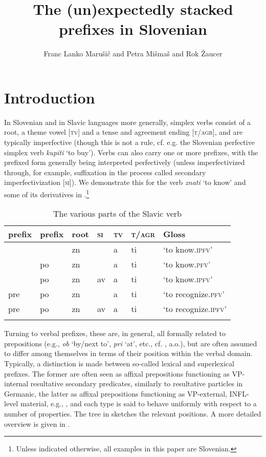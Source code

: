 \documentclass[output=paper,colorlinks,citecolor=brown]{langscibook}
\author{
Franc Lanko Marušič\orcid{0000-0002-0667-3236}\affiliation{University of Nova Gorica} and Petra Mišmaš\orcid{0000-0001-8659-875X}\affiliation{University of Nova Gorica} and Rok Žaucer\orcid{0000-0001-7771-6937}\affiliation{University of Nova Gorica}}
\title{The (un)expectedly stacked prefixes in Slovenian}
\begin{document}
\maketitle

\section{Introduction}\label{sec:introduction}

In Slovenian and in Slavic languages more generally, simplex verbs consist of a root, a theme vowel [\textsc{tv}] and a tense and agreement ending [\textsc{t/agr}], and are typically imperfective (though this is not a rule, cf. e.g. the Slovenian perfective simplex verb \textit{kupiti} `to buy'). Verbs can also carry one or more prefixes, with the prefixed form generally being interpreted perfectively (unless imperfectivized through, for example, suffixation in the process called secondary imperfectivization [\textsc{si}]). We demonstrate this for the verb \textit{znati} `to know' and some of its derivatives in .\footnote{Unless indicated otherwise, all examples in this paper are Slovenian.} 
    

\begin{table}
\begin{tabularx}{.8\textwidth}{lllllll}
\lsptoprule
  prefix  & prefix & root & \textsc{si}  & \textsc{tv} & \textsc{t/agr} & Gloss\\
 \midrule
  &  & zn &   & a & ti & `to know.\textsc{ipfv}'\\     
 & po & zn &   & a & ti & `to know.\textsc{pfv}'\\  
 & po & zn &  av & a & ti & `to know.\textsc{ipfv}'\\ 
pre & po & zn  &  & a & ti & `to recognize.\textsc{pfv}'\\ 
pre & po & zn  & av & a & ti & `to recognize.\textsc{ipfv}'\\ \lspbottomrule
\end{tabularx}
\caption{The various parts of the Slavic verb}
\label{tab:prerazporediti2}
\end{table}

Turning to verbal prefixes, these are, in general, all formally related to prepositions (e.g., \textit{ob} `by/next to', \textit{pri} `at', etc., cf. \citealt{matushansky2002formal, gehrke2008ps, caha2021prefixes}, a.o.), but are often assumed to differ among themselves in terms of their position within the verbal domain. Typically, a distinction is made between so-called lexical and superlexical prefixes. The former are often seen as affixal prepositions functioning as VP-internal resultative secondary predicates, similarly to resultative particles in Germanic, the latter as affixal prepositions functioning as VP-external, INFL-level material, e.g., \citet{Ramchand2004, Romanova2004, svenonius2004slavic}, and each type is said to behave uniformly with respect to a number of properties. The tree in  sketches the relevant positions. A more detailed overview is given in . 
\end{document}
